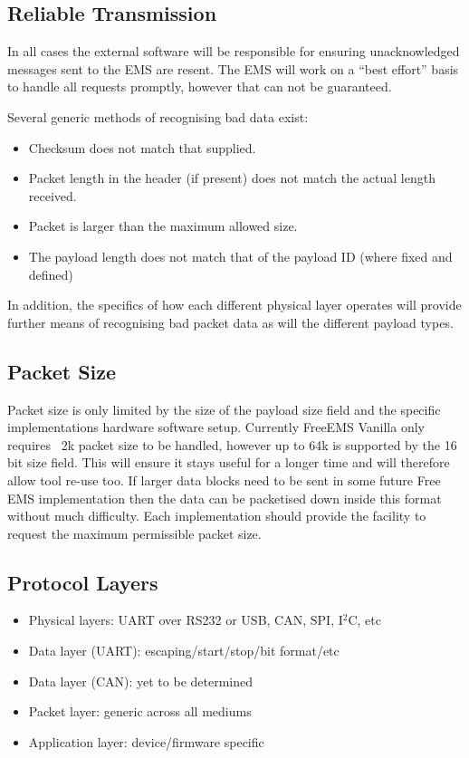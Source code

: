 \documentclass[12pt,a4paper,titlepage]{article}
\begin{document}
\subsection{Reliable Transmission}

In all cases the external software will be responsible for ensuring
unacknowledged messages sent to the EMS are resent. The EMS will work on a
``best effort'' basis to handle all requests promptly, however that can not be
guaranteed.

Several generic methods of recognising bad data exist:

\begin{itemize}
\item Checksum does not match that supplied.
\item Packet length in the header (if present) does not match the actual length received.
\item Packet is larger than the maximum allowed size.
\item The payload length does not match that of the payload ID (where fixed and defined)
\end{itemize}

In addition, the specifics of how each different physical layer operates will
provide further means of recognising bad packet data as will the different
payload types.

\subsection{Packet Size}

Packet size is only limited by the size of the payload size field and the
specific implementations hardware software setup. Currently FreeEMS Vanilla
only requires ~2k packet size to be handled, however up to 64k is supported by
the 16 bit size field. This will ensure it stays useful for a longer time and
will therefore allow tool re-use too. If larger data blocks need to be sent in
some future Free EMS implementation then the data can be packetised down inside
this format without much difficulty. Each implementation should provide the
facility to request the maximum permissible packet size.

\subsection{Protocol Layers}

\begin{itemize}
\item Physical layers: UART over RS232 or USB, CAN, SPI, I$^2$C, etc
\item Data layer (UART): escaping/start/stop/bit format/etc
\item Data layer (CAN): yet to be determined
\item Packet layer: generic across all mediums
\item Application layer: device/firmware specific
\end{itemize}
\end{document}
